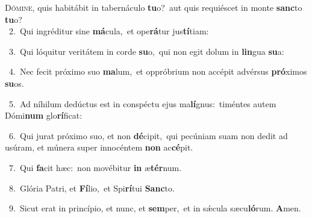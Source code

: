 \lettrine{\initial\textcolor{\initialcolor}{D}}{ómine,} quis habitábit in tabernáculo \textbf{tu}\-o?~\star aut quis requiéscet in monte \textbf{sanc}\-to \textbf{tu}\-o?\\
{\numbfont\textcolor{\numbcolor}{~2.}}~Qui ingréditur sine \textbf{má}\-cula,~\star et ope\-\textbf{rá}\-tur jus\-\textbf{tí}\-tiam:\par
{\numbfont\textcolor{\numbcolor}{~3.}}~Qui lóquitur veritátem in corde \textbf{su}\-o,~\star qui non egit dolum in \textbf{lin}\-gua \textbf{su}\-a:\par
{\numbfont\textcolor{\numbcolor}{~4.}}~Nec fecit próximo suo \textbf{ma}\-lum,~\star et oppróbrium non accépit advérsus \textbf{pró}\-ximos \textbf{su}\-os.\par
{\numbfont\textcolor{\numbcolor}{~5.}}~Ad níhilum dedúctus est in conspéctu ejus ma\-\textbf{lí}\-gnus:~\star timéntes autem Dómi\textbf{num} glo\-\textbf{rí}\-ficat:\par
{\numbfont\textcolor{\numbcolor}{~6.}}~Qui jurat próximo suo, et non \textbf{dé}\-cipit,~\star qui pecúniam suam non dedit ad usúram, et múnera super innocéntem \textbf{non} ac\-\textbf{cé}\-pit.\par
{\numbfont\textcolor{\numbcolor}{~7.}}~Qui \textbf{fa}\-cit hæc:~\star non movébitur \textbf{in} æ\-\textbf{tér}\-num.\par
{\numbfont\textcolor{\numbcolor}{~8.}}~Glória Patri, et \textbf{Fí}\-lio,~\star et Spi\-\textbf{rí}\-tui \textbf{Sanc}\-to.\par
{\numbfont\textcolor{\numbcolor}{~9.}}~Sicut erat in princípio, et nunc, et \textbf{sem}\-per,~\star et in sǽcula sæcu\-\textbf{ló}\-rum. \textbf{A}\-men.\par
